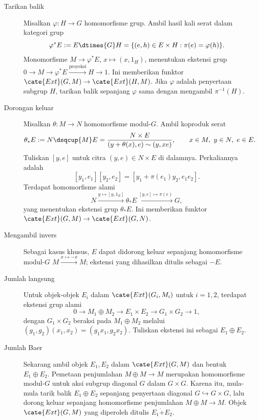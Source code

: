 \begin{description}
	\item[Tarikan balik] Misalkan $\varphi:H\to G$ homomorfisme grup. Ambil
	hasil kali serat dalam kategori grup
	\[ \varphi^*E:=E\dtimes{G}H
	=\{(e,h)\in E\times H:\pi(e)=\varphi(h)\}. \]
	Monomorfisme $M\to\varphi^*E$, $x\mapsto(x,1_H)$, menentukan ekstensi grup
	$0\to M\to\varphi^*E\xrightarrow{\text{proyeksi}}H\to1$. Ini memberikan
	funktor $\cate{Ext}(G,M)\to\cate{Ext}(H,M)$. Jika $\varphi$ adalah
	penyertaan subgrup $H$, tarikan balik sepanjang $\varphi$ sama dengan
	mengambil $\pi^{-1}(H)$.

	\item[Dorongan keluar] Misalkan $\theta:M\to N$ homomorfisme modul-$G$.
	Ambil koproduk serat
	\[ \theta_*E:=N\dsqcup{M}E
	=\frac{N\times E}{(y+\theta(x),e)\sim(y,xe)},
	\qquad x\in M,\ y\in N,\ e\in E. \]
	Tuliskan $[y,e]$ untuk citra $(y,e)\in N\times E$ di dalamnya. Perkaliannya
	adalah
	\[ [y_1,e_1][y_2,e_2]
	=[y_1+\pi(e_1)y_2,e_1e_2]. \]
	Terdapat homomorfisme alami
	\[ N\xrightarrow{y\mapsto[y,1_E]}\theta_*E
	\xrightarrow{[y,e]\mapsto\pi(e)}G, \]
	yang menentukan ekstensi grup $\theta_*E$. Ini memberikan funktor
	$\cate{Ext}(G,M)\to\cate{Ext}(G,N)$.

	\item[Mengambil invers] Sebagai kasus khusus, $E$ dapat didorong keluar
	sepanjang homomorfisme modul-$G$ $M\xrightarrow{x\mapsto-x}M$; ekstensi yang
	dihasilkan ditulis sebagai $-E$.

	\item[Jumlah langsung] Untuk objek-objek $E_i$ dalam
	$\cate{Ext}(G_i,M_i)$ untuk $i=1,2$, terdapat ekstensi grup alami
	\[ 0\to M_1\oplus M_2\to E_1\times E_2\to G_1\times G_2\to1, \]
	dengan $G_1\times G_2$ beraksi pada $M_1\oplus M_2$ melalui
	$(g_1,g_2)(x_1,x_2)=(g_1x_1,g_2x_2)$. Tuliskan ekstensi ini sebagai
	$E_1\oplus E_2$.

	\item[Jumlah Baer] Sekarang ambil objek $E_1,E_2$ dalam
	$\cate{Ext}(G,M)$ dan bentuk $E_1\oplus E_2$. Pemetaan penjumlahan
	$M\oplus M\to M$ merupakan homomorfisme modul-$G$ untuk aksi subgrup
	diagonal $G$ dalam $G\times G$. Karena itu, mula-mula tarik balik
	$E_1\oplus E_2$ sepanjang penyertaan diagonal $G\hookrightarrow G\times G$,
	lalu dorong keluar sepanjang homomorfisme penjumlahan $M\oplus M\to M$.
	Objek $\cate{Ext}(G,M)$ yang diperoleh ditulis $E_1\dot{+}E_2$.
\end{description}

